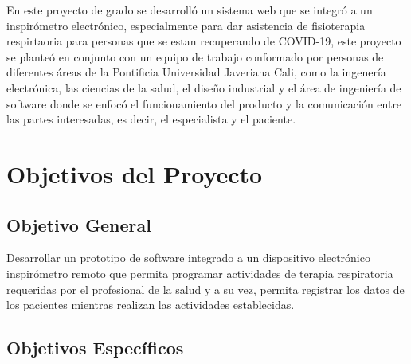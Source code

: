 \documentclass[12pt]{article}
\begin{document}
En este proyecto de grado se desarrolló un sistema web que se integró a un inspir\'ometro electr\'onico, especialmente para dar asistencia de fisioterapia respirtaoria para personas que se estan recuperando de COVID-19, este proyecto se planteó en conjunto con un equipo de trabajo conformado por personas de diferentes \'areas de la Pontificia Universidad Javeriana Cali, como la ingener\'ia electr\'onica, las ciencias de la salud, el dise\~{n}o industrial y el \'area de ingenier\'ia de software donde se enfocó el funcionamiento del producto y la comunicaci\'on entre las partes interesadas, es decir, el especialista y el paciente.








\newpage

\section{Objetivos del Proyecto}

\subsection*{Objetivo General}

Desarrollar un prototipo de software integrado a un dispositivo electr\'onico inspir\'ometro remoto que permita programar actividades de terapia respiratoria requeridas por el profesional de la salud y a su vez, permita registrar los datos de los pacientes mientras realizan las actividades establecidas.

\subsection{Objetivos Específicos}
\label{objetivoses}
\end{document}
